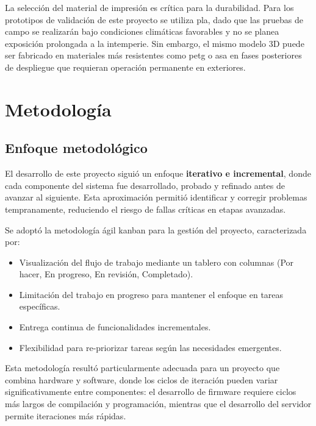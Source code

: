 \documentclass[a4paper, 12pt]{report}
\begin{document}
La selección del material de impresión es crítica para la durabilidad. Para los
prototipos de validación de este proyecto se utiliza \gls{pla}, dado que las
pruebas de campo se realizarán bajo condiciones climáticas favorables y
no se planea exposición prolongada a la intemperie. Sin embargo, el mismo modelo
3D puede ser fabricado en materiales más resistentes como \gls{petg} o \gls{asa} en
fases posteriores de despliegue que requieran operación permanente en exteriores.

\chapter{Metodología}

\section{Enfoque metodológico}

El desarrollo de este proyecto siguió un enfoque \textbf{iterativo e incremental},
donde cada componente del sistema fue desarrollado, probado y refinado antes de
avanzar al siguiente. Esta aproximación permitió identificar y corregir problemas
tempranamente, reduciendo el riesgo de fallas críticas en etapas avanzadas.

Se adoptó la metodología ágil \gls{kanban} para la gestión del proyecto,
caracterizada por:

\begin{itemize}
  \item Visualización del flujo de trabajo mediante un tablero con columnas
    (Por hacer, En progreso, En revisión, Completado).
  \item Limitación del trabajo en progreso para mantener el enfoque en tareas
    específicas.
  \item Entrega continua de funcionalidades incrementales.
  \item Flexibilidad para re-priorizar tareas según las necesidades emergentes.
\end{itemize}

Esta metodología resultó particularmente adecuada para un proyecto que combina
hardware y software, donde los ciclos de iteración pueden variar significativamente
entre componentes: el desarrollo de \gls{firmware} requiere ciclos más largos de
compilación y programación, mientras que el desarrollo del servidor permite iteraciones
más rápidas.
\end{document}
